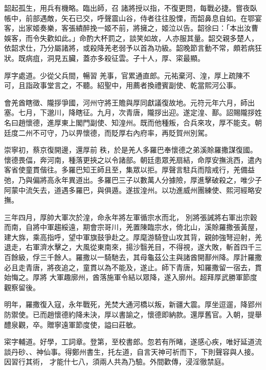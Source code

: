 \begin{pinyinscope}
 韶起孤生，用兵有機略。臨出師，召
 諸將授以指，不復更問，每戰必捷。嘗夜臥帳中，前部遇敵，矢石已交，呼聲震山谷，侍者往往股慄，而韶鼻息自如。在鄂宴客，出家姬奏樂，客張繢醉挽一姬不前，將擁之，姬泣以告。韶徐曰：「本出汝曹娛客，而令失歡如此。」命酌大杯罰之，談笑如故，人亦服其量。韶交親多楚人，依韶求仕，乃分屬諸將，或殺降羌老弱予以首為功級。韶晚節言動不常，頗若病狂狀。既病疽，洞見五臟，蓋亦多殺征雲。子十人，厚、寀最顯。



 厚字處道。少從父兵間，暢習
 羌事，官累通直郎。元祐棄河、湟，厚上疏陳不可，且詣政事堂言之，不聽。紹聖中，用薦者換禮賓副使、乾當熙河公事。



 會羌酋瞎徵、隴拶爭國，河州守將王贍與厚同獻議復故地。元符元年六月，師出塞。七月，下邈川，降瞎征。九月，次青唐，隴拶出迎。遂定湟、鄯。詔賜隴拶姓名曰趙懷德，進厚東上閣門副使、知湟州。既而他種叛，合兵來攻，厚不能支。朝廷度二州不可守，乃以畀懷德，而貶厚右內府率，再貶賀州別駕。



 崇寧初，蔡京復開邊，還厚前
 秩，於是羌人多羅巴奉懷德之弟溪賒羅撒謀復國。懷德畏偪，奔河南，種落更挾之以令諸部。朝廷患眾羌扇結，命厚安撫洮西，遣內客省使童貫偕往。多羅巴知王師且至，集眾以拒。厚聲言駐兵而陰戒行，羌備益弛，乃與偏將高永年異道出。多羅巴三子以數萬人分據險，厚進擊破殺之，唯少子阿蒙中流矢去，道遇多羅巴，與俱遁。遂拔湟州。以功進威州團練使、熙河經略安撫。



 三年四月，厚帥大軍次於湟，命永年將左軍循宗水而北，
 別將張誡將右軍出宗穀而南，自將中軍趨綏遠，期會宗哥川，羌置陳臨宗水，倚北山，溪賒羅撒張黃屋，建大旆，乘高指呼，望中軍旗鼓爭赴之。厚麾游騎登山攻其背，親帥強弩迎射，羌退走，右軍濟水擊之，大風從東南來，揚沙翳羌目，不得視，遂大敗，斬首四千三百餘級，俘三千餘人。羅撒以一騎馳去，其母龜茲公主與諸酋開鄯州降。厚計羅撒必且走青唐，將夜追之，童貫以為不能及，遂止。師下青唐，知羅撒留一宿去，貫始悔之。厚將
 大軍趣廓州，酋落施軍令結以眾降，遂入廓州。超拜厚武勝軍節度觀察留後。



 明年，羅撒復入寇，永年戰死，羌焚大通河橋以叛，新疆大震。厚坐逗遛，降郢州防禦使。已而趙懷德約降未決，厚以書諭之，懷德即納款。還厚舊官。入朝，提舉醴泉觀，卒。贈寧遠軍節度使，謚曰莊敏。



 寀字輔道。好學，工詞章。登第，至校書郎。忽若有所睹，遂感心疾，唯好延道流談丹砂、、神仙事。得鄭州書生，托左道，自言天神可祈而下，下則聲容與人接。因習行其術，
 才能什七八，須兩人共為乃驗。外間歡傳，浸淫徹禁庭。




\end{pinyinscope}
